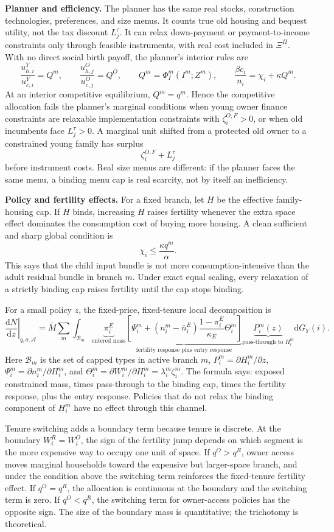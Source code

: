 \documentclass[10pt]{article}
\newcommand{\dd}{\mathrm d}
\newcommand{\1}{\mathbf 1}
\begin{document}
\textbf{Planner and efficiency.}
The planner has the same real stocks, construction technologies, preferences, and size menus. It counts true old housing and bequest utility, not the tax discount \(L_j^\tau\). It can relax down-payment or payment-to-income constraints only through feasible instruments, with real cost included in \(\Xi^\Pi\). With no direct social birth payoff, the planner's interior rules are
\[
\frac{u_{h,i}^Y}{u_{c,i}^Y}=Q^m,\qquad
\frac{u_{h,j}^O}{u_{c,j}^O}=Q^O,\qquad
Q^m=\Phi_I^m(I^m;Z^m),
\qquad
\frac{\beta c_i}{n_i}=\chi_i+\kappa Q^m .
\]
At an interior competitive equilibrium, \(Q^m=q^m\). Hence the competitive allocation fails the planner's marginal conditions when young owner finance constraints are relaxable implementation constraints with \(\zeta_i^{O,F}>0\), or when old incumbents face \(L_j^\tau>0\). A marginal unit shifted from a protected old owner to a constrained young family has surplus
\[
\zeta_i^{O,F}+L_j^\tau
\]
before instrument costs. Real size menus are different: if the planner faces the same menu, a binding menu cap is real scarcity, not by itself an inefficiency.

\textbf{Policy and fertility effects.}
For a fixed branch, let \(H\) be the effective family-housing cap. If \(H\) binds, increasing \(H\) raises fertility whenever the extra space effect dominates the consumption cost of buying more housing. A clean sufficient and sharp global condition is
\[
\chi_i\le\frac{\kappa q^m}{\alpha}.
\]
This says that the child input bundle is not more consumption-intensive than the adult residual bundle in branch \(m\). Under exact equal scaling, every relaxation of a strictly binding cap raises fertility until the cap stops binding.

For a small policy \(z\), the fixed-price, fixed-tenure local decomposition is
\[
\left.\frac{\dd N}{\dd z}\right|_{q,o,\mathcal A}
=
\bar M\sum_m\int_{\mathcal B_m}
\underbrace{\pi_i^E}_{\text{entered mass}}
\underbrace{\left[\Psi_i^m+(n_i^m-\bar n_i^E)\frac{1-\pi_i^E}{\kappa_E}\Theta_i^m\right]}_{\text{fertility response plus entry response}}
\underbrace{P_i^m(z)}_{\text{pass-through to }H_i^m}
\dd G_Y(i).
\]
Here \(\mathcal B_m\) is the set of capped types in active branch \(m\), \(P_i^m=\partial H_i^m/\partial z\), \(\Psi_i^m=\partial n_i^m/\partial H_i^m\), and \(\Theta_i^m=\partial W_i^m/\partial H_i^m=\lambda_i^m\zeta_i^m\). The formula says: exposed constrained mass, times pass-through to the binding cap, times the fertility response, plus the entry response. Policies that do not relax the binding component of \(H_i^m\) have no effect through this channel.

Tenure switching adds a boundary term because tenure is discrete. At the boundary \(W_i^R=W_i^O\), the sign of the fertility jump depends on which segment is the more expensive way to occupy one unit of space. If \(q^O>q^R\), owner access moves marginal households toward the expensive but larger-space branch, and under the condition above the switching term reinforces the fixed-tenure fertility effect. If \(q^O=q^R\), the allocation is continuous at the boundary and the switching term is zero. If \(q^O<q^R\), the switching term for owner-access policies has the opposite sign. The size of the boundary mass is quantitative; the trichotomy is theoretical.
\end{document}
